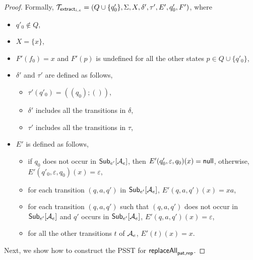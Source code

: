 \begin{proof}
	Formally, $\mathcal{T}_{\mathsf{extract}_{i,e}} = (Q \cup \{q'_0\}, \Sigma, X, \delta', \tau', E', q'_0, F')$, where 
	\begin{itemize}
		\item $q'_0 \not \in Q$,
		\item $X = \{x\}$,
		\item $F'(f_0)= x$ and $F'(p)$ is undefined for all the other states $p \in Q  \cup \{q'_0\}$,
		\item $\delta'$ and $\tau'$ are defined as follows,
		\begin{itemize}
			\item $\tau'(q'_0) = ((q_0); ())$,
			\item $\delta'$ includes all the transitions in $\delta$,
			\item $\tau'$ includes all the transitions in $\tau$,
		\end{itemize}
		\item $E'$ is defined as follows,
		\begin{itemize}
			\item if $q_0$ does not occur in ${\sf Sub}_{e'}[\mathcal{A}_e]$, then $E'(q'_0, \varepsilon, q_0)(x) = \mathsf{null}$, otherwise, $E'(q'_0, \varepsilon, q_0)(x) = \varepsilon$,
			\item for each transition $(q, a, q')$ in ${\sf Sub}_{e'}[\mathcal{A}_e]$, $E'(q, a, q')(x) = x a$,
			\item for each transition $(q, a, q')$ such that $(q, a, q')$ does not occur in ${\sf Sub}_{e'}[\mathcal{A}_e]$ and $q'$ occurs in ${\sf Sub}_{e'}[\mathcal{A}_e]$, $E'(q, a, q')(x) = \varepsilon$,
			\item for all the other transitions $t$ of $\mathcal{A}_e$, $E'(t)(x) = x$.
		\end{itemize}
	\end{itemize}



	Next, we show how to construct the PSST for $\mathsf{replaceAll}_{\mathsf{pat}, \mathsf{rep}}$. 
	

\end{proof}
